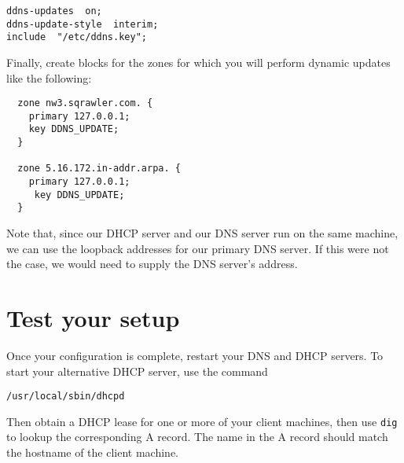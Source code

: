 \documentclass{article}
\begin{document}
\begin{verbatim}
ddns-updates  on;
ddns-update-style  interim;
include  "/etc/ddns.key";
\end{verbatim}

Finally, create blocks for the zones for which you will perform dynamic updates like the following:

\begin{verbatim}
  zone nw3.sqrawler.com. {
    primary 127.0.0.1;
    key DDNS_UPDATE;
  }

  zone 5.16.172.in-addr.arpa. {
    primary 127.0.0.1;
     key DDNS_UPDATE;
  }
\end{verbatim}

Note that, since our DHCP server and our DNS server run on the same machine, we can use the loopback 
addresses for our primary DNS server.  If this were not the case, we would need to supply the 
DNS server's address.

\section{Test your setup}
Once your configuration is complete, restart your DNS and DHCP servers.  To start your alternative DHCP server, use the command

\texttt{/usr/local/sbin/dhcpd}

Then obtain a DHCP lease for one or more of your client machines, then use \texttt{dig} to lookup the corresponding A record.  The name
in the A record should match the hostname of the client machine.
\end{document}
